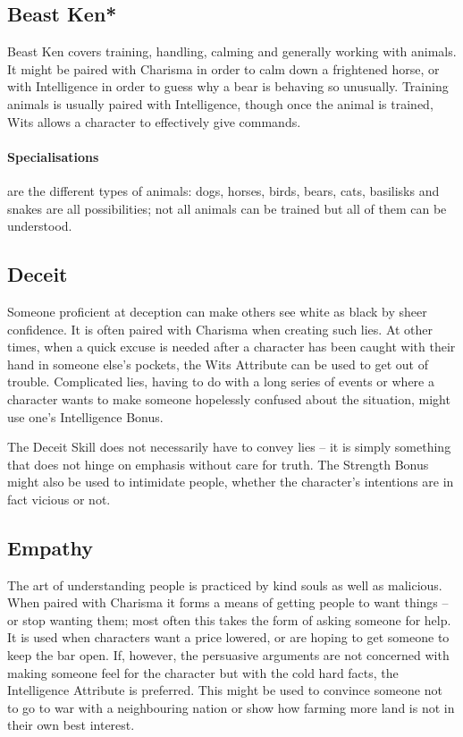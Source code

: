 \begin{multicols}{2}
\subsection{Beast Ken*}

Beast Ken covers training, handling, calming and generally working with animals. It might be paired with Charisma in order to calm down a frightened horse, or with Intelligence in order to guess why a bear is behaving so unusually. Training animals is usually paired with Intelligence, though once the animal is trained, Wits allows a character to effectively give commands.

\paragraph{Specialisations} are the different types of animals: dogs, horses, birds, bears, cats, basilisks and snakes are all possibilities; not all animals can be trained but all of them can be understood.

\subsection{Deceit}

Someone proficient at deception can make others see white as black by sheer confidence. It is often paired with Charisma when creating such lies. At other times, when a quick excuse is needed after a character has been caught with their hand in someone else's pockets, the Wits Attribute can be used to get out of trouble. Complicated lies, having to do with a long series of events or where a character wants to make someone hopelessly confused about the situation, might use one's Intelligence Bonus.

The Deceit Skill does not necessarily have to convey lies -- it is simply something that does not hinge on emphasis without care for truth. The Strength Bonus might also be used to intimidate people, whether the character's intentions are in fact vicious or not.

\subsection{Empathy}

The art of understanding people is practiced by kind souls as well as malicious. When paired with Charisma it forms a means of getting people to want things -- or stop wanting them; most often this takes the form of asking someone for help. It is used when characters want a price lowered, or are hoping to get someone to keep the bar open. If, however, the persuasive arguments are not concerned with making someone feel for the character but with the cold hard facts, the Intelligence Attribute is preferred. This might be used to convince someone not to go to war with a neighbouring nation or show how farming more land is not in their own best interest.


\end{multicols}
